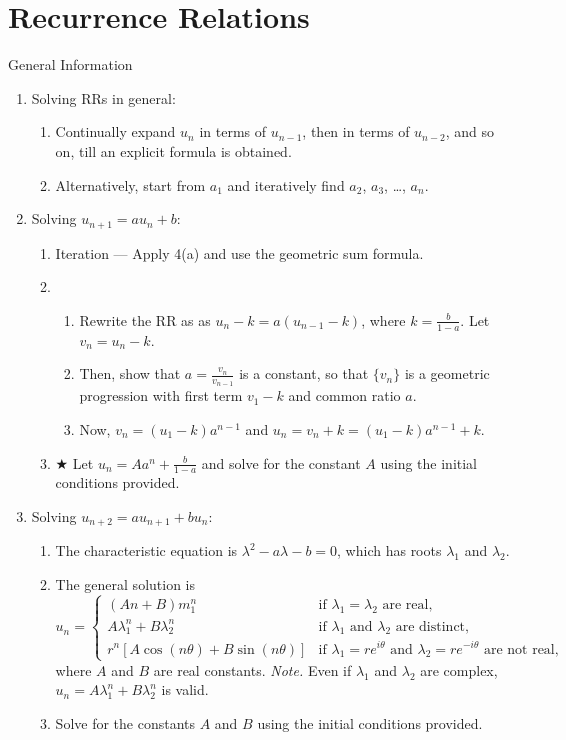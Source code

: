 \documentclass[oneside]{book}
\begin{document}
\chapter{Recurrence Relations}
\begin{stbox}{General Information}{}
  \begin{enumerate}
    \item Solving RRs in general:
    \begin{enumerate}
      \item Continually expand \(u_n\) in terms of \(u_{n-1}\), then in terms of \(u_{n-2}\), and so on, till an explicit formula is obtained.
      \item Alternatively, start from \(a_1\) and iteratively find \(a_2\), \(a_3\), \ldots, \(a_n\).
    \end{enumerate}
    \item Solving \(u_{n+1}=au_{n}+b\):
    \begin{enumerate}
      \item Iteration --- Apply 4(a) and use the geometric sum formula.
      \item
      \begin{enumerate}
        \item Rewrite the RR as as \(u_n-k=a(u_{n-1}-k)\), where \(k=\frac{b}{1-a}\). Let \(v_n=u_n-k\).
        \item Then, show that \(a=\frac{v_n}{v_{n-1}}\) is a constant, so that \(\{v_n\}\) is a geometric progression with first term \(v_1-k\) and common ratio \(a\). 
        \item Now, \(v_n=(u_1-k)a^{n-1}\) and \(u_n=v_n+k=(u_1-k)a^{n-1}+k\).
      \end{enumerate}
      \item \(\bigstar\) Let \(u_n=Aa^n+\frac{b}{1-a}\) and solve for the constant \(A\) using the initial conditions provided.
    \end{enumerate}
    \item Solving \(u_{n+2}=au_{n+1}+bu_n\):
    \begin{enumerate}[label=\roman*.]
      \item The characteristic equation is \(\lambda^2-a\lambda-b=0\), which has roots \(\lambda_1\) and \(\lambda_2\).
      \item The general solution is
      \[u_n=\begin{cases}
        (An+B)m_1^n &\text{if \(\lambda_1=\lambda_2\) are real},\\
        A\lambda_1^n+B\lambda_2^n &\text{if \(\lambda_1\) and \(\lambda_2\) are distinct},\\
        r^n[A\cos(n\theta)+B\sin(n\theta)] &\text{if \(\lambda_1=re^{i\theta}\) and \(\lambda_2=re^{-i\theta}\) are not real},
      \end{cases}\]
      where \(A\) and \(B\) are real constants. \emph{Note.} Even if \(\lambda_1\) and \(\lambda_2\) are complex, \(u_n=A\lambda_1^n+B\lambda_2^n\) is valid.
      \item Solve for the constants \(A\) and \(B\) using the initial conditions provided.
    \end{enumerate}
  \end{enumerate}
\end{stbox}
\end{document}
